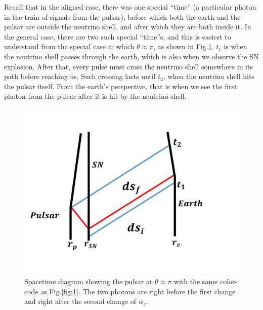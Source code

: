 \documentclass[aps,showpacs,onecolumn,floats,prd,superscriptaddress,nofootinbib]{revtex4}
\begin{document}
Recall that in the aligned case, there was one special ``time'' (a particular photon in the train of signals from the pulsar), before which both the earth and the pulsar are outside the neutrino shell, and after which they are both inside it. In the general case, there are two such special ``time''s, and this is easiest to understand from the special case in which $\theta \approx \pi$, as shown in Fig.\ref{fig-opposite}. $t_1$ is when the neutrino shell passes through the earth, which is also when we observe the SN explosion. After that, every pulse must cross the neutrino shell somewhere in its path before reaching us. Such crossing lasts until $t_2$, when the neutrino shell hits the pulsar itself. From the earth's perspective, that is when we see the first photon from the pulsar after it is hit by the neutrino shell.

\begin{figure}[tb]
\begin{center}
\includegraphics[scale = 0.3]{Image5.pdf}
\caption{Spacetime diagram showing the pulsar at $\theta \approx \pi$ with the same color-code as Fig.\ref{fig:1}. The two photons are right before the first change and right after the second change of $\dot{w_e}$.}
\label{fig-opposite}
\end{center}
\end{figure}
\end{document}
